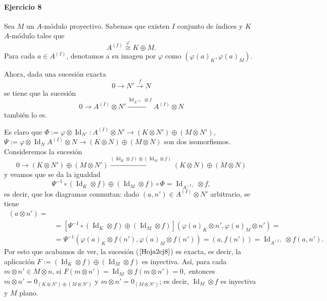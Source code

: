\documentclass[./ejercicios.tex]{subfiles}
\begin{document}
\paragraph{Ejercicio 8} Sea $M$ un $A$-módulo proyectivo. Sabemos que existen $I$ conjunto de índices y $K$ $A$-módulo tales que
$$A^{(I)}\overset{\varphi}{\cong} K\oplus M.$$
Para cada $a\in A^{(I)}$, denotamos a su imagen por $\varphi$ como $(\varphi(a)_K,\varphi(a)_M)$.

Ahora, dada una sucesión exacta
$$0\longrightarrow N'\overset{f}{\longrightarrow}N$$
se tiene que la sucesión
$$0\longrightarrow A^{(I)}\otimes N'\overset{\operatorname{Id}_{A^{(I)}}\otimes f}{\longrightarrow} A^{(I)}\otimes N$$
también lo es. 

Es claro que $\Phi:=\varphi\otimes \operatorname{Id}_{N'}: A^{(I)}\otimes N'\longrightarrow (K\otimes N')\oplus(M\otimes N')$, $\Psi:=\varphi\otimes \operatorname{Id}_{N}A^{(I)}\otimes N\longrightarrow (K\otimes N)\oplus(M\otimes N)$ son dos isomorfismos. Consideremos la sucesión
\begin{equation}\label{Hoja2ej8}
0\longrightarrow (K\otimes N')\oplus(M\otimes N')\overset{(\operatorname{Id}_{K}\otimes f)\oplus (\operatorname{Id}_{M}\otimes f)}{\longrightarrow} (K\otimes N)\oplus(M\otimes N)
\end{equation}
y veamos que se da la igualdad
$$\Psi^{-1}\circ(\operatorname{Id}_{K}\otimes f)\oplus (\operatorname{Id}_{M}\otimes f)\circ\Phi=\operatorname{Id}_{A^{(I)}}\otimes f,$$
es decir, que los diagramas conmutan: dado $(a,n')\in A^{(I)}\otimes N'$ arbitrario, se tiene
\begin{align*}
[\Psi^{-1}\circ&(\operatorname{Id}_{K}\otimes f)\oplus (\operatorname{Id}_{M}\otimes f)\circ\Phi]\ (a\otimes n')=\\
&=[\Psi^{-1}\circ(\operatorname{Id}_{K}\otimes f)\oplus (\operatorname{Id}_{M}\otimes f)](\varphi(a)_K\otimes n',\varphi(a)_M\otimes n')=\\
&=\Psi^{-1}(\varphi(a)_K\otimes f(n'),\varphi(a)_M\otimes f(n'))=(a,f(n'))=\operatorname{Id}_{A^{(I)}}\otimes f(a,n').
\end{align*}
Por esto que acabamos de ver, la sucesión ($\ref{Hoja2ej8}$) es exacta, es decir, la aplicación $F:=(\operatorname{Id}_{K}\otimes f)\oplus (\operatorname{Id}_{M}\otimes f)$ es inyectiva. 
Así, para cada $m\otimes n'\in M\otimes n$, si $F(m\otimes n')=\operatorname{Id}_{M}\otimes f(m\otimes n')=0,$ entonces $m\otimes n'=0_{(K\otimes N')\oplus(M\otimes N')}$ y $m\otimes n'=0_{(M\otimes N')}$; es decir, $\operatorname{Id}_{M}\otimes f$ es inyectiva y $M$ plano.
\end{document}
